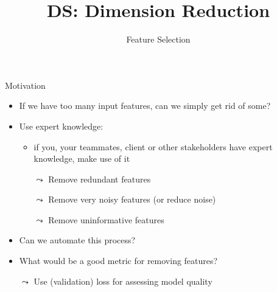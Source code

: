 \documentclass[aspectratio=169]{../latex_main/tntbeamer}  %
\title[Statistics]{DS: Dimension Reduction}
\subtitle{Feature Selection}
\begin{document}
	
	\maketitle
	
    \begin{frame}[c]{Motivation}

    \begin{itemize}
        \item If we have too many input features, can we simply get rid of some?
        \item Use expert knowledge:
        \begin{itemize}
            \item if you, your teammates, client or other stakeholders have expert knowledge, make use of it
            \item[$\leadsto$] Remove redundant features
            \item[$\leadsto$] Remove very noisy features (or reduce noise)
            \item[$\leadsto$] Remove uninformative features
        \end{itemize}
        \pause
        \medskip
        \item Can we automate this process?
        \item What would be a good metric for removing features?
        \item[$\leadsto$] Use (validation) loss for assessing model quality
    \end{itemize}

	\end{frame}
	
\end{document}
